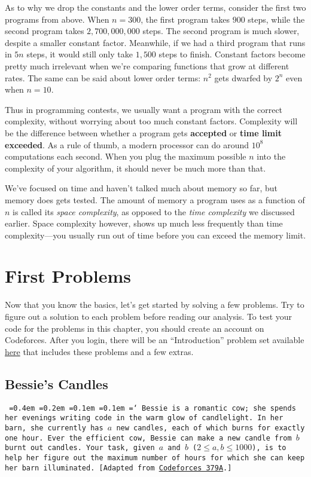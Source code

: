 As to why we drop the constants and the lower order terms, consider the first two programs from above. When $n=300$, the first program takes $900$ steps, while the second program takes $2,700,000,000$ steps. The second program is much slower, despite a smaller constant factor. Meanwhile, if we had a third program that runs in $5n$ steps, it would still only take $1,500$ steps to finish. Constant factors become pretty much irrelevant when we're comparing functions that grow at different rates. The same can be said about lower order terms: $n^2$ gets dwarfed by $2^n$ even when $n=10$.

Thus in programming contests, we usually want a program with the correct complexity, without worrying about too much constant factors. Complexity will be the difference between whether a program gets \textbf{\color{green}accepted} or \textbf{\color{red}time limit exceeded}. As a rule of thumb, a modern processor can do around $10^8$ computations each second. When you plug the maximum possible $n$ into the complexity of your algorithm, it should never be much more than that.

We've focused on time and haven't talked much about memory so far, but memory does gets tested. The amount of memory a program uses as a function of $n$ is called its \emph{space complexity}, as opposed to the \emph{time complexity} we discussed earlier. Space complexity however, shows up much less frequently than time complexity---you usually run out of time before you can exceed the memory limit.

\section{First Problems}

Now that you know the basics, let's get started by solving a few problems. Try to figure out a solution to each problem before reading our analysis. To test your code for the problems in this chapter, you should create an account on Codeforces. After you login, there will be an ``Introduction'' problem set available \href{http://codeforces.com/group/5tN48zOVvQ/contests}{here} that includes these problems and a few extras.

\subsection{Bessie's Candles}

\texttt{
  \font=0.4em%
  \font=0.2em%
  \font=0.1em%
  \font=0.1em%
  \hyphenchar\font=`\-%
  Bessie is a romantic cow; she spends her evenings writing code in the warm glow of candlelight. In her barn, she currently has $a$ new candles, each of which burns for exactly one hour. Ever the efficient cow, Bessie can make a new candle from $b$ burnt out candles. Your task, given $a$ and $b$ ($2 \le a, b \le 1000$), is to help her figure out the maximum number of hours for which she can keep her barn illuminated. [Adapted from \href{http://codeforces.com/problemset/problem/379/A}{Codeforces 379A}.]
}


